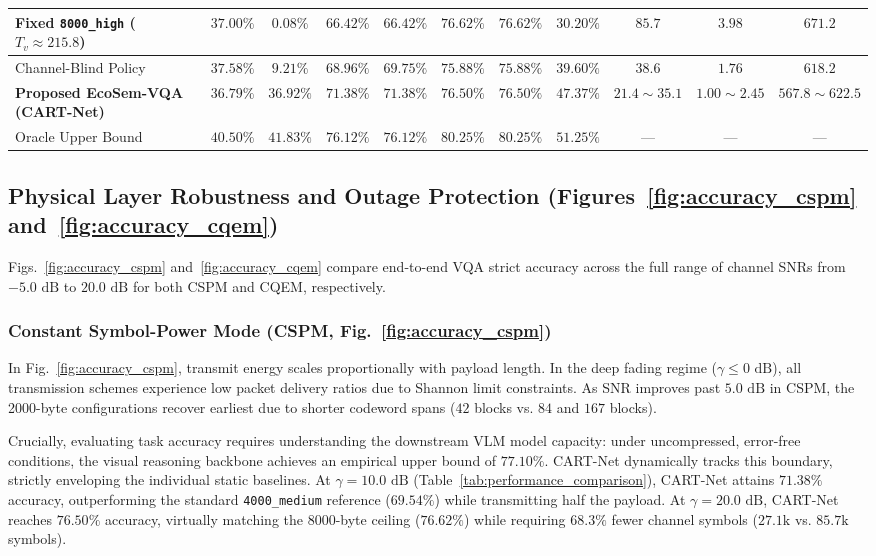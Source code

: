 \begin{table}[!t]
{\begin{tabular}{lcccccccccc}
Fixed \texttt{8000\_high} ($T_v \approx 215.8$) & $37.00\%$ & $0.08\%$ & $66.42\%$ & $66.42\%$ & $76.62\%$ & $76.62\%$ & $30.20\%$ & $85.7$ & $3.98$ & $671.2$ \\
\midrule
Channel-Blind Policy & $37.58\%$ & $9.21\%$ & $68.96\%$ & $69.75\%$ & $75.88\%$ & $75.88\%$ & $39.60\%$ & $38.6$ & $1.76$ & $618.2$ \\
\textbf{Proposed EcoSem-VQA (CART-Net)} & $\mathbf{36.79\%}$ & $\mathbf{36.92\%}$ & $\mathbf{71.38\%}$ & $\mathbf{71.38\%}$ & $\mathbf{76.50\%}$ & $\mathbf{76.50\%}$ & $\mathbf{47.37\%}$ & $\mathbf{21.4 \sim 35.1}$ & $\mathbf{1.00 \sim 2.45}$ & $\mathbf{567.8 \sim 622.5}$ \\
\midrule
Oracle Upper Bound & $40.50\%$ & $41.83\%$ & $76.12\%$ & $76.12\%$ & $80.25\%$ & $80.25\%$ & $51.25\%$ & --- & --- & --- \\
\bottomrule
\end{tabular}%
}
\end{table}

\subsection{Physical Layer Robustness and Outage Protection (Figures~\ref{fig:accuracy_cspm} and~\ref{fig:accuracy_cqem})}
Figs.~\ref{fig:accuracy_cspm} and~\ref{fig:accuracy_cqem} compare end-to-end VQA strict accuracy across the full range of channel SNRs from $-5.0\text{ dB}$ to $20.0\text{ dB}$ for both CSPM and CQEM, respectively.

\subsubsection{Constant Symbol-Power Mode (CSPM, Fig.~\ref{fig:accuracy_cspm})}
In Fig.~\ref{fig:accuracy_cspm}, transmit energy scales proportionally with payload length. In the deep fading regime ($\gamma \le 0\text{ dB}$), all transmission schemes experience low packet delivery ratios due to Shannon limit constraints. As SNR improves past $5.0\text{ dB}$ in CSPM, the 2000-byte configurations recover earliest due to shorter codeword spans ($42$ blocks vs. $84$ and $167$ blocks).

Crucially, evaluating task accuracy requires understanding the downstream VLM model capacity: under uncompressed, error-free conditions, the visual reasoning backbone achieves an empirical upper bound of $77.10\%$. CART-Net dynamically tracks this boundary, strictly enveloping the individual static baselines. At $\gamma = 10.0\text{ dB}$ (Table~\ref{tab:performance_comparison}), CART-Net attains $71.38\%$ accuracy, outperforming the standard \texttt{4000\_medium} reference ($69.54\%$) while transmitting half the payload. At $\gamma = 20.0\text{ dB}$, CART-Net reaches $76.50\%$ accuracy, virtually matching the 8000-byte ceiling ($76.62\%$) while requiring $68.3\%$ fewer channel symbols ($27.1\text{k}$ vs. $85.7\text{k}$ symbols).

